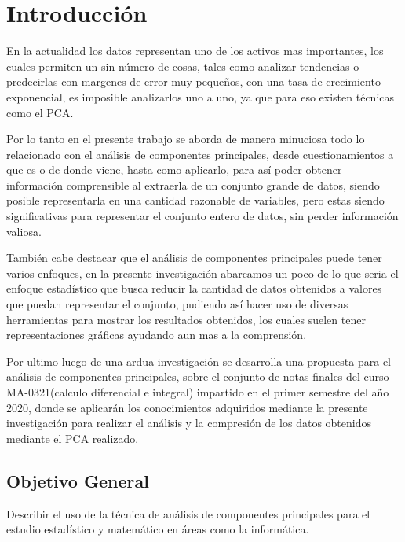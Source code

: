 \chapter{Introducción}
\label{ch:introduccion}

En la actualidad los datos representan uno de los activos mas importantes, los cuales permiten un sin número de cosas, tales como analizar tendencias o predecirlas con margenes de error muy pequeños, con una tasa de crecimiento exponencial, es imposible analizarlos uno a uno, ya que para eso existen técnicas como el PCA.

Por lo tanto en el presente trabajo se aborda de manera minuciosa todo lo relacionado con el análisis de componentes principales, desde cuestionamientos a que es o de donde viene, hasta como aplicarlo, para así poder obtener información comprensible al extraerla de un conjunto grande de datos, siendo posible representarla en una cantidad razonable de variables, pero estas siendo significativas para representar el conjunto entero de datos, sin perder información valiosa.

También cabe destacar que el análisis de componentes principales puede tener varios enfoques, en la presente investigación abarcamos un poco de lo que seria el enfoque estadístico que busca reducir la cantidad de datos obtenidos a valores que puedan representar el conjunto, pudiendo así hacer uso de diversas herramientas para mostrar los resultados obtenidos, los cuales suelen tener representaciones gráficas ayudando aun mas a la comprensión.

Por ultimo luego de una ardua investigación se desarrolla una propuesta para el análisis de componentes principales, sobre el conjunto de notas finales del curso MA-0321(calculo diferencial e integral) impartido en el primer semestre del año 2020, donde se aplicarán los conocimientos adquiridos mediante la presente investigación para realizar el análisis y la compresión de los datos obtenidos mediante el PCA realizado.






\newpage

\section{Objetivo General}

Describir el uso  de la técnica de análisis de componentes principales para el estudio estadístico y matemático en áreas como la informática.

